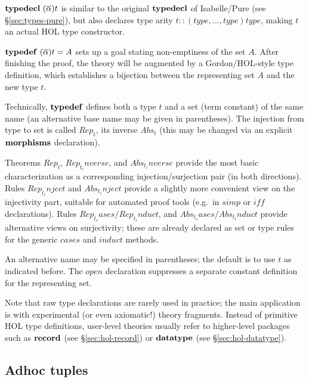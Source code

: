 \begin{descr}
  
\item [${\mathord{\mathbf{typedecl}}}~(\overline{\alpha})t$] is similar to the original
  ${\mathord{\mathbf{typedecl}}}$ of Isabelle/Pure (see \S\ref{sec:types-pure}), but
  also declares type arity $t :: (type, \dots, type) type$, making $t$ an
  actual HOL type constructor.
  
\item [${\mathord{\mathbf{typedef}}}~(\overline{\alpha})t = A$] sets up a goal stating
  non-emptiness of the set $A$.  After finishing the proof, the theory will be
  augmented by a Gordon/HOL-style type definition, which establishes a
  bijection between the representing set $A$ and the new type $t$.
  
  Technically, ${\mathord{\mathbf{typedef}}}$ defines both a type $t$ and a set (term
  constant) of the same name (an alternative base name may be given in
  parentheses).  The injection from type to set is called $Rep_t$, its inverse
  $Abs_t$ (this may be changed via an explicit ${\mathord{\mathbf{morphisms}}}$
  declaration).
  
  Theorems $Rep_t$, $Rep_t_inverse$, and $Abs_t_inverse$ provide the most
  basic characterization as a corresponding injection/surjection pair (in both
  directions).  Rules $Rep_t_inject$ and $Abs_t_inject$ provide a slightly
  more convenient view on the injectivity part, suitable for automated proof
  tools (e.g.\ in $simp$ or $iff$ declarations).  Rules
  $Rep_t_cases/Rep_t_induct$, and $Abs_t_cases/Abs_t_induct$ provide
  alternative views on surjectivity; these are already declared as set or type
  rules for the generic $cases$ and $induct$ methods.
  
  An alternative name may be specified in parentheses; the default is to use
  $t$ as indicated before.  The $open$ declaration suppresses a separate
  constant definition for the representing set.
\end{descr}

Note that raw type declarations are rarely used in practice; the main
application is with experimental (or even axiomatic!) theory fragments.
Instead of primitive HOL type definitions, user-level theories usually refer
to higher-level packages such as ${\mathord{\mathbf{record}}}$ (see
\S\ref{sec:hol-record}) or ${\mathord{\mathbf{datatype}}}$ (see
\S\ref{sec:hol-datatype}).


\subsection{Adhoc tuples}

